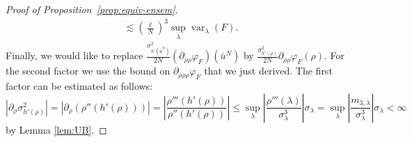 \documentclass[11pt, a4paper]{article}
\newcommand{\tmop}[1]{\ensuremath{\operatorname{#1}}}
\newcommand{\1}{\mathbf{1}}
\begin{document}
\begin{proof}[Proof of Proposition~\ref{prop:equiv-ensem}]
\begin{align*}
   [(\bar{u}^N - \rho)^6] \lesssim \left( \frac{\ell}{N} \right)^3
   \sup_{\lambda} \tmop{var}_{\lambda} (F).
  \end{align*}
  Finally, we would like to replace $\frac{\sigma_{h' (\bar{u}^N)}^2}{2 N}
  (\partial_{\rho \rho} \varphi_F) (\bar{u}^N)$ by $\frac{\sigma^2_{h'
  (\rho)}}{2 N} \partial_{\rho \rho} \varphi_F (\rho)$. For the second factor
  we use the bound on $\partial_{\rho \rho \rho} \varphi_F$ that we just
  derived. The first factor can be estimated as follows:
  \[ | \partial_{\rho} \sigma^2_{h' (\rho)} | = | \partial_{\rho} (\rho'' (h'
     (\rho))) | = \left| \frac{\rho''' (h' (\rho))}{\rho'' (h' (\rho))}
     \right| \leqslant \sup_{\lambda} \left| \frac{\rho'''
     (\lambda)}{\sigma_{\lambda}^3} \right| \sigma_{\lambda} = \sup_{\lambda}
     \left| \frac{m_{3, \lambda}}{\sigma_{\lambda}^3} \right| \sigma_{\lambda}
     < \infty \]
     by Lemma \ref{lem:UB}.
\end{proof}
\end{document}
